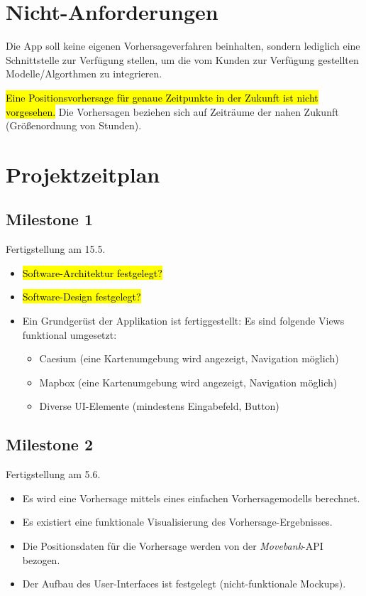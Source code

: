 \documentclass[12pt]{article} %
\begin{document}
 \section{Nicht-Anforderungen} \label{nicht-anforderungen}

Die App soll keine eigenen Vorhersageverfahren beinhalten, sondern lediglich eine Schnittstelle zur Verfügung stellen, um die vom Kunden zur Verfügung gestellten Modelle/Algorthmen zu integrieren.

\hl{Eine Positionsvorhersage für genaue Zeitpunkte in der Zukunft ist nicht vorgesehen.} Die Vorhersagen beziehen sich auf Zeiträume der nahen Zukunft (Größenordnung von Stunden).



\newpage
\section{Projektzeitplan} \label{zeitplan}

\subsection*{Milestone 1}
Fertigstellung am 15.5.
\begin{itemize} 
	\item \hl{Software-Architektur festgelegt?}
	\item \hl{Software-Design festgelegt?}	
	\item Ein Grundgerüst der Applikation ist fertiggestellt: Es sind folgende Views funktional umgesetzt:
	\begin{itemize} 
		\item Caesium (eine Kartenumgebung wird angezeigt, Navigation möglich)
		\item Mapbox (eine Kartenumgebung wird angezeigt, Navigation möglich)
		\item Diverse UI-Elemente (mindestens Eingabefeld, Button)
	\end{itemize} 
\end{itemize} 

\vspace{1em}

\subsection*{Milestone 2}
Fertigstellung am 5.6.
\begin{itemize} 
	\item Es wird eine Vorhersage mittels eines einfachen Vorhersagemodells berechnet.
	\item Es existiert eine funktionale Visualisierung des Vorhersage-Ergebnisses.
	\item Die Positionsdaten für die Vorhersage werden von der \textit{Movebank}-API bezogen.
	\item Der Aufbau des User-Interfaces ist festgelegt (nicht-funktionale Mockups).
\end{itemize}
\end{document}
